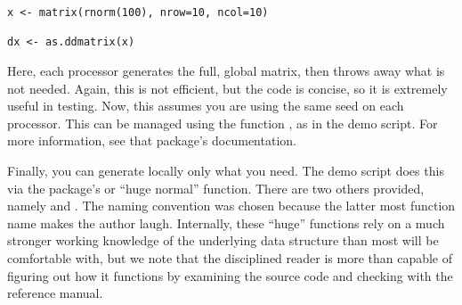 \begin{lstlisting}[language=rr]
x <- matrix(rnorm(100), nrow=10, ncol=10)

dx <- as.ddmatrix(x)
\end{lstlisting}

Here, each processor generates the full, global matrix, then throws away what is not needed.  Again, this is not efficient, but the code is concise, so it is extremely useful in testing.  Now, this assumes you are using the same seed on each processor.  This can be managed using the  function , as in the demo script.  For more information, see that package's documentation.

Finally, you can generate locally only what you need.  The demo script does this via the  package's  or ``huge normal'' function.  There are two others provided, namely  and .  The naming convention was chosen because the latter most function name makes the author laugh.  Internally, these ``huge'' functions rely on a much stronger working knowledge of the underlying data structure than most will be comfortable with, but we note that the disciplined reader is more than capable of figuring out how it functions by examining the source code and checking with the reference manual.
% 
% 





